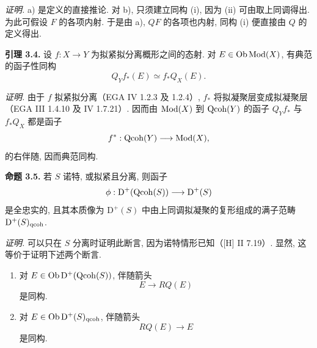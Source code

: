 \emph{证明.} a) 是定义的直接推论. 对 b), 只须建立同构 (i), 因为 (ii) 可由取上同调得出. 为此可假设 $F$ 的各项内射. 于是由 a), $QF$ 的各项也内射, 同构 (i) 便直接由 $Q$ 的定义得出.

\textbf{引理 3.4.} 设 $f:X\to Y$ 为拟紧拟分离概形之间的态射. 对 $E\in\operatorname{Ob}\operatorname{Mod}(X)$, 有典范的函子性同构
\[
 Q_Y f_*(E)\simeq f_*Q_X(E).
\]

\emph{证明.} 由于 $f$ 拟紧拟分离（EGA IV 1.2.3 及 1.2.4）, $f_*$ 将拟凝聚层变成拟凝聚层（EGA III 1.4.10 及 IV 1.7.21）. 因而由 $\operatorname{Mod}(X)$ 到 $\operatorname{Qcoh}(Y)$ 的函子 $Q_Yf_*$ 与 $f_*Q_X$ 都是函子
\[
 f^*: \operatorname{Qcoh}(Y)\longrightarrow \operatorname{Mod}(X),
\]
的右伴随, 因而典范同构.

\textbf{命题 3.5.} 若 $S$ 诺特, 或拟紧且分离, 则函子
\[
 \phi:\mathrm D^+(\operatorname{Qcoh}(S))\longrightarrow \mathrm D^+(S)
\]
是全忠实的, 且其本质像为 $\mathrm D^+(S)$ 中由上同调拟凝聚的复形组成的满子范畴 $\mathrm D^+(S)_{\mathrm{qcoh}}$.

\emph{证明.} 可以只在 $S$ 分离时证明此断言, 因为诺特情形已知（[H] II 7.19）. 显然, 这等价于证明下述两个断言.

\begin{enumerate}[label=(3.5.\arabic*)]
\item 对 $E\in\operatorname{Ob}\mathrm D^+(\operatorname{Qcoh}(S))$, 伴随箭头
\[
 E\longrightarrow RQ(E)
\]
是同构.
\item 对 $E\in\operatorname{Ob}\mathrm D^+(S)_{\mathrm{qcoh}}$, 伴随箭头
\[
 RQ(E)\longrightarrow E
\]
是同构.
\end{enumerate}

